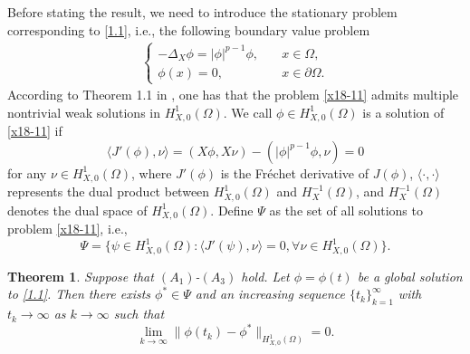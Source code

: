 \documentclass[11pt,a4paper]{article}
\numberwithin{equation}{section}
\newtheorem{thm}{Theorem}[section]
\newcommand{\ds}{\displaystyle}
\numberwithin{remark}{section}
\begin{document}
Before stating the result, we need to introduce the stationary problem corresponding to \eqref{1.1}, i.e., the following boundary value problem
\begin{align}\label{x18-11}
 \left\{\begin{array}{ll}
     \ds -\Delta_X\phi=|\phi|^{p-1}\phi,\quad &x\in\Omega,\\
     \ds \phi(x)=0,\quad &x\in\partial\Omega.
    \end{array}\right.
\end{align}
According to Theorem 1.1 in \cite{MR4354732,MR4491354}, one has that the problem \eqref{x18-11} admits multiple nontrivial weak solutions in $H_{X,0}^1(\Omega)$. We call $\phi\in H_{X,0}^1(\Omega)$ is a solution of \eqref{x18-11} if
\begin{equation}\label{x19-11}
\langle J'(\phi),\nu\rangle=(X\phi,X\nu)-\left(|\phi|^{p-1}\phi,\nu\right)=0
\end{equation}
for any $\nu\in H_{X,0}^1(\Omega)$, where $J'(\phi)$ is the Fr\'{e}chet derivative of $J(\phi)$, $\langle\cdot,\cdot\rangle$ represents the dual product between $H_{X,0}^1(\Omega)$ and $H_X^{-1}(\Omega)$, and $H_X^{-1}(\Omega)$ denotes the dual space of $H_{X,0}^1(\Omega)$. Define $\Psi$ as the set of all solutions to problem \eqref{x18-11}, i.e.,
\begin{equation*}
\Psi=\{\psi\in H_{X,0}^1(\Omega):\langle J'(\psi),\nu\rangle=0,\forall\nu\in H_{X,0}^1(\Omega)\}.
\end{equation*}

\begin{thm}\label{xx-33}
Suppose that $(A_1)$-$(A_3)$ hold. Let $\phi=\phi(t)$ be a global solution to \eqref{1.1}. Then there exists $\phi^*\in \Psi$ and an increasing sequence $\{t_k\}_{k=1}^\infty$ with $t_k\rightarrow\infty$ as $k\rightarrow\infty$ such that
\begin{equation*}
\lim_{k\rightarrow\infty}\|\phi(t_k)-\phi^*\|_{H_{X,0}^1(\Omega)}=0.
\end{equation*}
\end{thm}
\end{document}
